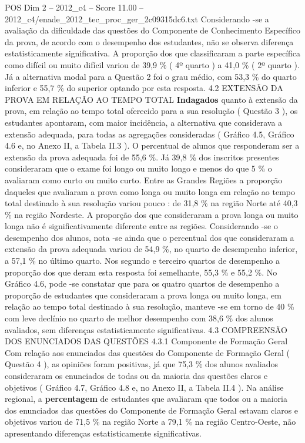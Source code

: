 \begin{textsample}{POS Dim 2 – 2012\_c4 – Score 11.00 – 2012\_c4/enade\_2012\_tec\_proc\_ger\_2c09315dc6.txt}
Considerando -se a avaliação da dificuldade das questões do Componente de Conhecimento Específico da prova, de acordo com o desempenho dos estudantes, não se observa diferença estatisticamente significativa.
A proporção dos que classificaram a parte específica como difícil ou muito difícil variou de 39,9 \% ( 4º quarto ) a 41,0 \% ( 2º quarto ).
Já a alternativa modal para a Questão 2 foi o grau médio, com 53,3 \% do quarto inferior e 55,7 \% do superior optando por esta resposta. 4.2 EXTENSÃO DA PROVA EM RELAÇÃO AO TEMPO TOTAL \textbf{Indagados} quanto à extensão da prova, em relação ao tempo total oferecido para a sua resolução ( Questão 3 ), os estudantes apontaram, com maior incidência, a alternativa que considerava a extensão adequada, para todas as agregações consideradas ( Gráfico 4.5, Gráfico 4.6 e, no Anexo II, a Tabela II.3 ).
O percentual de alunos que responderam ser a extensão da prova adequada foi de 55,6 \%.
Já 39,8 \% dos inscritos presentes consideraram que o exame foi longo ou muito longo e menos do que 5 \% o avaliaram como curto ou muito curto.
Entre as Grandes Regiões a proporção daqueles que avaliaram a prova como longa ou muito longa em relação ao tempo total destinado à sua resolução variou pouco : de 31,8 \% na região Norte até 40,3 \% na região Nordeste.
A proporção dos que consideraram a prova longa ou muito longa não é significativamente diferente entre as regiões.
Considerando -se o desempenho dos alunos, nota -se ainda que o percentual dos que consideraram a extensão da prova adequada variou de 54,9 \%, no quarto de desempenho inferior, a 57,1 \% no último quarto.
Nos segundo e terceiro quartos de desempenho a proporção dos que deram esta resposta foi semelhante, 55,3 \% e 55,2 \%.
No Gráfico 4.6, pode -se constatar que para os quatro quartos de desempenho a proporção de estudantes que consideraram a prova longa ou muito longa, em relação ao tempo total destinado à sua resolução, manteve -se em torno de 40 \% com leve declínio no quarto de melhor desempenho com 38,6 \% dos alunos avaliados, sem diferenças estatisticamente significativas. 4.3 COMPREENSÃO DOS ENUNCIADOS DAS QUESTÕES 4.3.1 Componente de Formação Geral Com relação aos enunciados das questões do Componente de Formação Geral ( Questão 4 ), as opiniões foram positivas, já que 75,3 \% dos alunos avaliados consideraram os enunciados de todas ou da maioria das questões claros e objetivos ( Gráfico 4.7, Gráfico 4.8 e, no Anexo II, a Tabela II.4 ).
Na análise regional, a \textbf{percentagem} de estudantes que avaliaram que todos ou a maioria dos enunciados das questões do Componente de Formação Geral estavam claros e objetivos variou de 71,5 \% na região Norte a 79,1 \% na região Centro-Oeste, não apresentando diferenças estatisticamente significativas.

\end{textsample}
